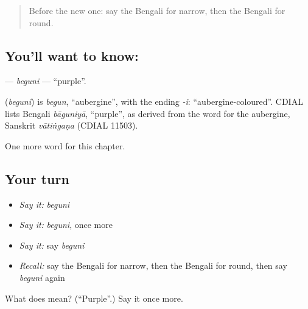 \label{lesson:BN-C136-beguni}



\begin{quote}
Before the new one: say the Bengali for narrow, then the Bengali for round.
\end{quote}

\subsection*{You'll want to know: }
\textbf{} — \emph{beguni} — \textquotedblleft{}purple\textquotedblright{}.

\begin{cousinweb}
\textbf{} (\emph{beguni}) is \emph{begun}, \textquotedblleft{}aubergine\textquotedblright{}, with the ending \emph{-i}: \textquotedblleft{}aubergine-coloured\textquotedblright{}. CDIAL lists Bengali \emph{bāguniyā}, \textquotedblleft{}purple\textquotedblright{}, as derived from the word for the aubergine, Sanskrit \emph{vātiṅgaṇa} (CDIAL 11503).
\end{cousinweb}

\begin{grammarlens}[title={What you've built}]
One more word for this chapter.
\end{grammarlens}

\subsection*{Your turn}
\begin{itemize}
\raggedright
  \item \emph{Say it:} \emph{beguni}
  \item \emph{Say it:} \emph{beguni}, once more
  \item \emph{Say it:} say \emph{beguni}
  \item \emph{Recall:} say the Bengali for narrow, then the Bengali for round, then say \emph{beguni} again
\end{itemize}

\begin{tcolorbox}[breakable,colback=teal!4,colframe=teal!35!black,title={Before you move on}]
What does  mean? (\textquotedblleft{}Purple\textquotedblright{}.) Say it once more.
\end{tcolorbox}

